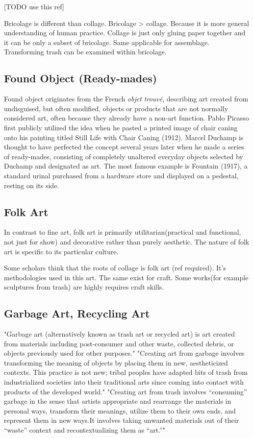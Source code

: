 [TODO use this ref]\cite{strasser1999waste}

Bricolage is different than collage. Bricolage > collage. Because it is more general understanding of human practice. Collage is just only gluing paper together and it can be only a subset of bricolage. Same applicable for assemblage. Transforming trash can be examined within bricolage. 


\subsection{Found Object (Ready-mades)}
Found object originates from the French \textit{objet trouvé}, describing art created from undisguised, but often modified, objects or products that are not normally considered art, often because they already have a non-art function. Pablo Picasso first publicly utilized the idea when he pasted a printed image of chair caning onto his painting titled Still Life with Chair Caning (1912). Marcel Duchamp is thought to have perfected the concept several years later when he made a series of ready-mades, consisting of completely unaltered everyday objects selected by Duchamp and designated as art. The most famous example is Fountain (1917), a standard urinal purchased from a hardware store and displayed on a pedestal, resting on its side.


\subsection{Folk Art}
In contrast to fine art, folk art is primarily utilitarian(practical and functional, not just for show) and decorative rather than purely aesthetic. The nature of folk art is specific to its particular culture.

Some scholars think that the roots of collage is folk art (ref required). It's methodologies used in this art. The same exist for craft. Some works(for example sculptures from trash) are highly requires craft skills.

\subsection{Garbage Art, Recycling Art}
"Garbage art (alternatively known as trash art or recycled art) is art created from materials including post-consumer and other waste, collected debris, or objects previously used for other purposes." "Creating art from garbage involves transforming the meaning of objects by placing them in new, aestheticized contexts. This practice is not new; tribal peoples have adapted bits of trash from industrialized societies into their traditional arts since coming into contact with products of the developed world." "Creating art from trash involves “consuming” garbage in the sense that artists appropriate and rearrange the materials in personal ways, transform their meanings, utilize them to their own ends, and represent them in new ways.It involves taking unwanted materials out of their “waste” context and recontextualizing them as “art.”" \cite{tauxe2012encyclopedia}


